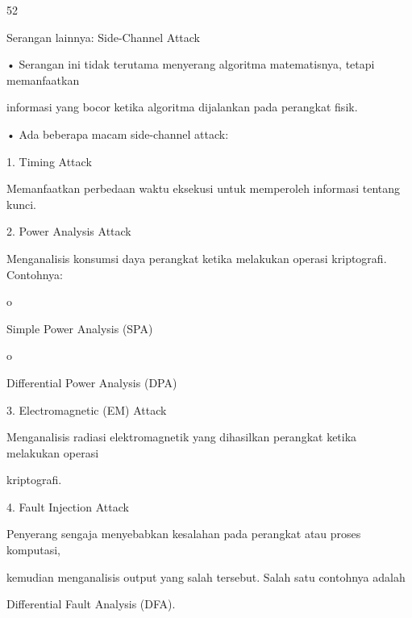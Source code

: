 \documentclass{article}
\begin{document}

52

Serangan lainnya: Side-Channel Attack

• Serangan ini tidak terutama menyerang algoritma matematisnya, tetapi memanfaatkan 

informasi yang bocor ketika algoritma dijalankan pada perangkat fisik.

• Ada beberapa macam side-channel attack:

1. Timing Attack

Memanfaatkan perbedaan waktu eksekusi untuk memperoleh informasi tentang kunci. 

2. Power Analysis Attack

Menganalisis konsumsi daya perangkat ketika melakukan operasi kriptografi. Contohnya: 

o

Simple Power Analysis (SPA) 

o

Differential Power Analysis (DPA) 

3. Electromagnetic (EM) Attack

Menganalisis radiasi elektromagnetik yang dihasilkan perangkat ketika melakukan operasi 

kriptografi. 

4. Fault Injection Attack

Penyerang sengaja menyebabkan kesalahan pada perangkat atau proses komputasi, 

kemudian menganalisis output yang salah tersebut. Salah satu contohnya adalah 

Differential Fault Analysis (DFA).
\end{document}
